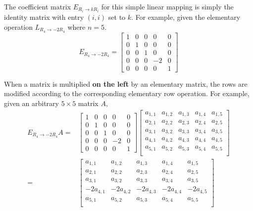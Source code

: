 \documentclass{article}
\begin{document}
The coefficient matrix \(E_{R_i \rightarrow kR_i}\) for this simple linear mapping is simply the identity matrix with entry \((i, i)\) set to \(k\). For example, given the elementary operation \(L_{R_4 \rightarrow -2R_4}\) where \(n = 5\). 
\[E_{R_4 \rightarrow -2R_4} = \begin{bmatrix} 
1 & 0 & 0 & 0 & 0 \\
0 & 1 & 0 & 0 & 0 \\
0 & 0 & 1 & 0 & 0 \\
0 & 0 & 0 & -2 & 0 \\
0 & 0 & 0 & 0 & 1
\end{bmatrix}\]

When a matrix is multiplied {\bf on the left} by an elementary matrix, the rows are modified according to the corresponding elementary row operation. For example, given an arbitrary \(5 \times 5\) matrix \(A\),
\begin{align*}
E_{R_4 \rightarrow -2R_4}A = & \begin{bmatrix} 
1 & 0 & 0 & 0 & 0 \\
0 & 1 & 0 & 0 & 0 \\
0 & 0 & 1 & 0 & 0 \\
0 & 0 & 0 & -2 & 0 \\
0 & 0 & 0 & 0 & 1
\end{bmatrix}\begin{bmatrix}
a_{1,1} & a_{1,2} & a_{1,3} & a_{1,4} & a_{1,5} \\ 
a_{2,1} & a_{2,2} & a_{2,3} & a_{2,4} & a_{2,5} \\ 
a_{3,1} & a_{3,2} & a_{3,3} & a_{3,4} & a_{3,5} \\ 
a_{4,1} & a_{4,2} & a_{4,3} & a_{4,4} & a_{4,5} \\ 
a_{5,1} & a_{5,2} & a_{5,3} & a_{5,4} & a_{5,5} \\ 
\end{bmatrix} \\
= & \begin{bmatrix}
a_{1,1} & a_{1,2} & a_{1,3} & a_{1,4} & a_{1,5} \\ 
a_{2,1} & a_{2,2} & a_{2,3} & a_{2,4} & a_{2,5} \\ 
a_{3,1} & a_{3,2} & a_{3,3} & a_{3,4} & a_{3,5} \\ 
-2a_{4,1} & -2a_{4,2} & -2a_{4,3} & -2a_{4,4} & -2a_{4,5} \\ 
a_{5,1} & a_{5,2} & a_{5,3} & a_{5,4} & a_{5,5} \\ 
\end{bmatrix}
\end{align*}
\end{document}
